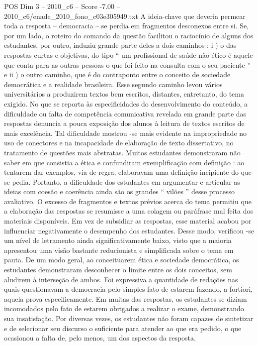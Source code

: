 \begin{textsample}{POS Dim 3 – 2010\_c6 – Score -7.00 – 2010\_c6/enade\_2010\_fono\_c03e305949.txt}
A ideia-chave que deveria permear toda a resposta – democracia – se perdia em fragmentos desconexos entre si.
Se, por um lado, o roteiro do comando da questão facilitou o raciocínio de alguns dos estudantes, por outro, induziu grande parte deles a dois caminhos : i ) o das respostas curtas e objetivas, do tipo “ um profissional de saúde não ético é aquele que conta para as outras pessoas o que foi feito na consulta com o seu paciente ” e ii ) o outro caminho, que é do contraponto entre o conceito de sociedade democrática e a realidade brasileira.
Esse segundo caminho levou vários universitários a produzirem textos bem escritos, distantes, entretanto, do tema exigido.
No que se reporta às especificidades do desenvolvimento do conteúdo, a dificuldade ou falta de competência comunicativa revelada em grande parte das respostas denuncia a pouca exposição dos alunos à leitura de textos escritos de mais excelência.
Tal dificuldade mostrou -se mais evidente na impropriedade no uso de conectores e na incapacidade de elaboração de texto dissertativo, no tratamento de questões mais abstratas.
Muitos estudantes demonstraram não saber em que consistia a ética e confundiram exemplificação com definição : ao tentarem dar exemplos, via de regra, elaboravam uma definição incipiente do que se pedia.
Portanto, a dificuldade dos estudantes em argumentar e articular as ideias com coesão e coerência ainda são os grandes “ vilões ” desse processo avaliativo.
O excesso de fragmentos e textos prévios acerca do tema permitiu que a elaboração das respostas se resumisse a uma colagem ou paráfrase mal feita dos materiais disponíveis.
Em vez de subsidiar as respostas, esse material acabou por influenciar negativamente o desempenho dos estudantes.
Desse modo, verificou -se um nível de letramento ainda significativamente baixo, visto que a maioria apresentou uma visão bastante reducionista e simplificada sobre o tema em pauta.
De um modo geral, ao conceituarem ética e sociedade democrática, os estudantes demonstraram desconhecer o limite entre os dois conceitos, sem aludirem à interseção de ambos.
Foi expressiva a quantidade de redações nas quais questionavam a democracia pelo simples fato de estarem fazendo, a fortiori, aquela prova especificamente.
Em muitas das respostas, os estudantes se diziam incomodados pelo fato de estarem obrigados a realizar o exame, demonstrando sua insatisfação.
Por diversas vezes, os estudantes não foram capazes de sintetizar e de selecionar seu discurso o suficiente para atender ao que era pedido, o que ocasionou a falta de, pelo menos, um dos aspectos da resposta.

\end{textsample}
